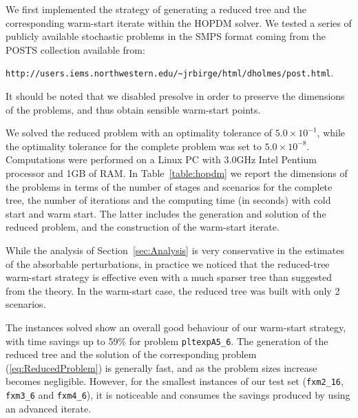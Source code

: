 We first implemented the strategy of generating a reduced tree and 
the corresponding warm-start iterate within the HOPDM \cite{Gondzio96} 
solver. We tested a series of publicly available stochastic problems in 
the SMPS format \cite{SMPS} coming from the POSTS collection 
available from:
\begin{center}
{\tt http://users.iems.northwestern.edu/\~{}jrbirge/html/dholmes/post.html}.
\end{center}
%
%
It should be noted that we disabled presolve %
in order to preserve the dimensions of the problems, and thus obtain 
sensible warm-start points.

We solved the reduced problem with an optimality tolerance of 
$5.0\times 10^{-1}$, while the optimality tolerance for the complete 
problem was set to $5.0\times 10^{-8}$. 
Computations were performed on a Linux PC with 3.0GHz Intel Pentium 
processor and 1GB of RAM.
In Table~\ref{table:hopdm} we report the dimensions of the problems 
in terms of the number of stages and scenarios for the complete 
tree, the number of iterations and the computing time (in seconds) 
with cold start and warm start. The latter includes the generation 
and solution of the reduced problem, and the construction of the 
warm-start iterate.

While the analysis of Section~\ref{sec:Analysis} is very conservative
in the estimates of the absorbable perturbations, in practice we noticed
that the reduced-tree warm-start strategy is effective even with
a much sparser tree than suggested from the theory.
In the warm-start case, the reduced tree was built with only 2 scenarios.

The instances solved show an overall good behaviour of our warm-start
strategy, with time savings up to 59\% for problem {\tt pltexpA5\_6}.
The generation of the reduced tree and the solution of the corresponding
problem (\ref{eq:ReducedProblem}) is generally fast, and as the problem 
sizes increase becomes negligible. However, for the smallest instances
of our test set ({\tt fxm2\_16}, {\tt fxm3\_6} and {\tt fxm4\_6}), it
is noticeable and consumes the savings produced by using an advanced
iterate.

